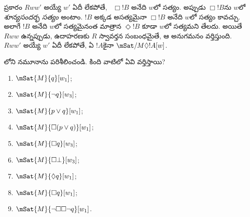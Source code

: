 \documentclass[../../../include/open-logic-section]{subfiles}
\begin{document}
 ప్రకారం
$Rww'$ అయ్యే $w'$ ఏదీ లేకపోతే,
~$\Box
!B$ అనేది $w$లో సత్యం. అప్పుడు $\Box !B$ను
$w$లో \emph{శూన్యసందర్భ సత్యం} అంటాం.
$!B$ అక్కడ అసత్యమైనా $\Box !B$ అనేది $w$లో
సత్యం కావచ్చు. అలాగే $!B$ అనేది $w$లో సత్యమైనంత
మాత్రాన $\Diamond !B$ కూడా $w$లో సత్యమని తేలదు.
అయితే $Rww$ ఉన్నప్పుడు, ఉదాహరణకు $R$ స్వావర్తన
సంబంధమైతే, ఆ అనుగమనం వర్తిస్తుంది. $Rww'$ అయ్యే $w'$ ఏదీ లేకపోతే,
ఏ $!A$కైనా $\mSat/{M}{\Diamond !A}[w]$.

\begin{prob}
  లోని
  నమూనాను పరిశీలించండి. కింది
  వాటిలో ఏవి వర్తిస్తాయి?
    \begin{enumerate}
    \item $\mSat{M}{q}[w_1]$;
    \item $\mSat{M}{\lnot q}[w_3]$;
    \item $\mSat{M}{p \lor q}[w_1]$;
    \item $\mSat{M}{\Box (p \lor q)}[w_1]$;
    \item $\mSat{M}{\Box q}[w_3]$;
    \item $\mSat{M}{\Box \bot}[w_3]$;
    \item $\mSat{M}{\Diamond q}[w_1]$;
    \item $\mSat{M}{\Box q}[w_1]$;
    \item $\mSat{M}{\lnot \Box\Box \lnot q}[w_1]$.
    \end{enumerate}
\end{prob}
\end{document}
